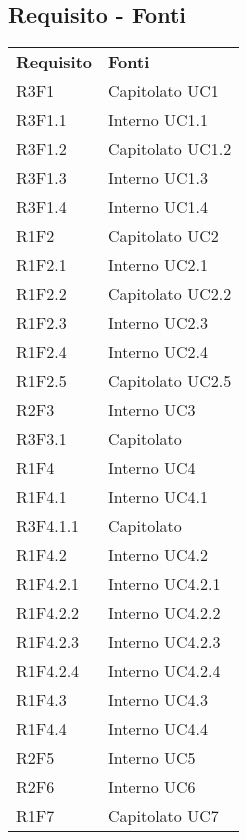 	\subsection{Requisito - Fonti}
	\begin{longtable} {
			>{\centering}p{28mm}  
			>{}p{20mm}
		}
		\rowcolor{gray!50}
		\textbf{Requisito} & \textbf{Fonti}	\TBstrut \\
		R3F1 & Capitolato UC1 \TBstrut \\ [2mm]		
		R3F1.1 & Interno UC1.1 \TBstrut \\ [2mm]		
		R3F1.2 & Capitolato UC1.2 \TBstrut \\ [2mm]		
		R3F1.3 & Interno UC1.3 \TBstrut \\ [2mm]		
		R3F1.4 & Interno UC1.4 \TBstrut \\ [2mm]		
		R1F2 & Capitolato UC2 \TBstrut \\ [2mm]		
		R1F2.1 & Interno UC2.1 \TBstrut \\ [2mm]	
		R1F2.2 & Capitolato UC2.2 \TBstrut \\ [2mm]		
		R1F2.3 & Interno UC2.3 \TBstrut \\ [2mm]		
		R1F2.4 & Interno UC2.4 \TBstrut \\ [2mm]		
		R1F2.5 & Capitolato UC2.5 \TBstrut \\ [2mm]		
		R2F3 & Interno UC3 \TBstrut \\ [2mm]		
		R3F3.1 & Capitolato \TBstrut \\ [2mm]	
		R1F4 & Interno UC4 \TBstrut \\ [2mm]	
		R1F4.1 & Interno UC4.1 \TBstrut \\ [2mm]		
		R3F4.1.1 & Capitolato \TBstrut \\ [2mm]		
		R1F4.2 & Interno UC4.2 \TBstrut \\ [2mm]		
		R1F4.2.1 & Interno UC4.2.1 \TBstrut \\ [2mm]		
		R1F4.2.2 & Interno UC4.2.2 \TBstrut \\ [2mm]		
		R1F4.2.3 & Interno UC4.2.3 \TBstrut \\ [2mm]		
		R1F4.2.4 & Interno UC4.2.4 \TBstrut \\ [2mm]		
		R1F4.3 & Interno UC4.3 \TBstrut \\ [2mm]		
		R1F4.4 & Interno UC4.4 \TBstrut \\ [2mm]		
		R2F5 & Interno UC5 \TBstrut \\ [2mm]
		R2F6 & Interno UC6 \TBstrut \\ [2mm]		
		R1F7 & Capitolato UC7 \TBstrut \\ [2mm]

\end{longtable}

